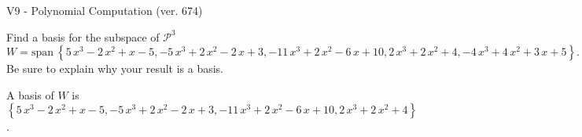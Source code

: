 \begin{exercise}
  \begin{exerciseTitle}V9 - Polynomial Computation (ver. 674)\end{exerciseTitle}
  \begin{exerciseStatement}
    Find a basis for the subspace of \(\mathcal{P}^3\) 
\[W=\mathrm{span}\ \left\{5 \, x^{3} - 2 \, x^{2} + x - 5 , -5 \, x^{3} + 2 \, x^{2} - 2 \, x + 3 , -11 \, x^{3} + 2 \, x^{2} - 6 \, x + 10 , 2 \, x^{3} + 2 \, x^{2} + 4 , -4 \, x^{3} + 4 \, x^{2} + 3 \, x + 5\right\}.\]
 Be sure to explain why your result is a basis.


  \end{exerciseStatement}
  \begin{exerciseAnswer}
   A basis of \(W\) is  \(\left\{5 \, x^{3} - 2 \, x^{2} + x - 5 , -5 \, x^{3} + 2 \, x^{2} - 2 \, x + 3 , -11 \, x^{3} + 2 \, x^{2} - 6 \, x + 10 , 2 \, x^{3} + 2 \, x^{2} + 4\right\}\).
  


  \end{exerciseAnswer}
\end{exercise}